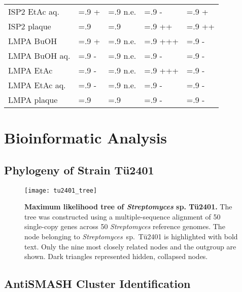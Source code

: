 \begin{table}[htbp]
\begin{tabularx}{\textwidth}{>{\hsize=1.4\hsize}X>{\hsize=.9\hsize}X>{\hsize=.9\hsize}X>{\hsize=.9\hsize}X>{\hsize=.9\hsize}X}
            ISP2 EtAc aq.   & +     & n.e.  & -     & +    \\
            ISP2 plaque     &       &       & ++    & ++   \\
            \midrule
            LMPA BuOH       & +     & n.e.  & +++   & -    \\
            LMPA BuOH aq.   & -     & n.e.  & -     & -    \\
            LMPA EtAc       & -     & n.e.  & +++   & -    \\
            LMPA EtAc aq.   & -     & n.e.  & -     & -    \\
            LMPA plaque     &       &       & -     & -    \\
            \bottomrule
        \end{tabularx}
    \end{table}


\section{Bioinformatic Analysis} %
\label{sec:species_antismash}

    \subsection{Phylogeny of Strain Tü2401} %
    \label{sub:phylogeny_of_strain_tue2401}

	\begin{figure}[htbp]
		\texttt{[image: tu2401\_tree]}
		\caption[Maximum likelihood tree of \emph{Streptomyces} sp. Tü2401.]{%
			\textbf{Maximum likelihood tree of \emph{Streptomyces} sp. Tü2401.}
			The tree was constructed using a multiple-sequence alignment of 50 single-copy genes across 50 \textit{Streptomyces} reference genomes.
			The node belonging to \textit{Streptomyces}~sp.~Tü2401 is highlighted with bold text.
			Only the nine most closely related nodes and the outgroup are shown.
			Dark triangles represented hidden, collapsed nodes.}
		\label{fig:phylo_tree} 
	\end{figure}


    \subsection{AntiSMASH Cluster Identification} %
    \label{sub:antismash_cluster_identification}

